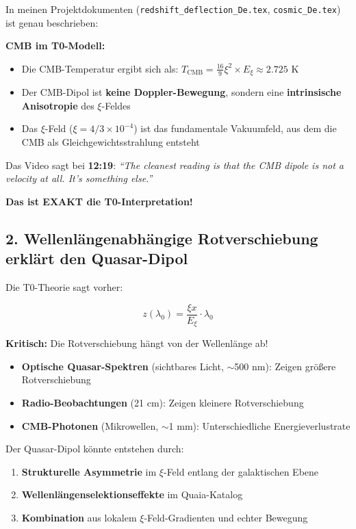 \documentclass{article}
\begin{document}
	In meinen Projektdokumenten (\texttt{redshift\_deflection\_De.tex}, \texttt{cosmic\_De.tex}) ist genau beschrieben:
	
	\textbf{CMB im T0-Modell:}
	\begin{itemize}
		\item Die CMB-Temperatur ergibt sich als: $T_{\text{CMB}} = \frac{16}{9} \xi^2 \times E_\xi \approx 2.725$ K
		\item Der CMB-Dipol ist \textbf{keine Doppler-Bewegung}, sondern eine \textbf{intrinsische Anisotropie} des $\xi$-Feldes
		\item Das $\xi$-Feld ($\xi = 4/3 \times 10^{-4}$) ist das fundamentale Vakuumfeld, aus dem die CMB als Gleichgewichtsstrahlung entsteht
	\end{itemize}
	
	Das Video sagt bei \textbf{12:19}: \textit{``The cleanest reading is that the CMB dipole is not a velocity at all. It's something else.''}
	
	\textbf{Das ist EXAKT die T0-Interpretation!}
	
	\subsection{2. Wellenl{\"a}ngenabh{\"a}ngige Rotverschiebung erkl{\"a}rt den Quasar-Dipol}
	
	Die T0-Theorie sagt vorher:
	
	$$z(\lambda_0) = \frac{\xi x}{E_\xi} \cdot \lambda_0$$
	
	\textbf{Kritisch:} Die Rotverschiebung h{\"a}ngt von der Wellenl{\"a}nge ab!
	
	\begin{itemize}
		\item \textbf{Optische Quasar-Spektren} (sichtbares Licht, $\sim$500 nm): Zeigen gr{\"o}{\ss}ere Rotverschiebung
		\item \textbf{Radio-Beobachtungen} (21 cm): Zeigen kleinere Rotverschiebung
		\item \textbf{CMB-Photonen} (Mikrowellen, $\sim$1 mm): Unterschiedliche Energieverlustrate
	\end{itemize}
	
	Der Quasar-Dipol k{\"o}nnte entstehen durch:
	\begin{enumerate}
		\item \textbf{Strukturelle Asymmetrie} im $\xi$-Feld entlang der galaktischen Ebene
		\item \textbf{Wellenl{\"a}ngenselektionseffekte} im Quaia-Katalog \cite{storey2024}
		\item \textbf{Kombination} aus lokalem $\xi$-Feld-Gradienten und echter Bewegung
	\end{enumerate}
	
\end{document}

